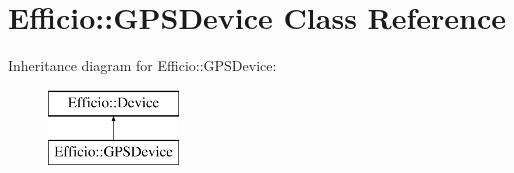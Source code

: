 \hypertarget{class_efficio_1_1_g_p_s_device}{}\section{Efficio\+:\+:G\+P\+S\+Device Class Reference}
\label{class_efficio_1_1_g_p_s_device}
Inheritance diagram for Efficio\+:\+:G\+P\+S\+Device\+:\begin{figure}[H]
\begin{center}
\leavevmode
\includegraphics[height=2.000000cm]{class_efficio_1_1_g_p_s_device}
\end{center}
\end{figure}
